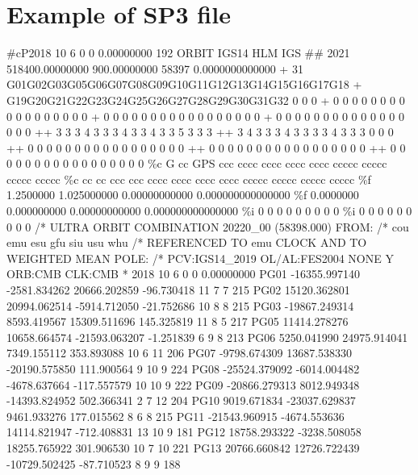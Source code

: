\FloatBarrier
\chapter{Example of SP3 file}
\label{app:sp3}

#cP2018 10  6  0  0  0.00000000     192 ORBIT IGS14 HLM  IGS
## 2021 518400.00000000   900.00000000 58397 0.0000000000000
+   31   G01G02G03G05G06G07G08G09G10G11G12G13G14G15G16G17G18
+        G19G20G21G22G23G24G25G26G27G28G29G30G31G32  0  0  0
+          0  0  0  0  0  0  0  0  0  0  0  0  0  0  0  0  0
+          0  0  0  0  0  0  0  0  0  0  0  0  0  0  0  0  0
+          0  0  0  0  0  0  0  0  0  0  0  0  0  0  0  0  0
++         3  3  3  4  3  3  3  4  3  3  4  3  3  5  3  3  3
++         3  4  3  3  3  4  3  3  3  3  4  3  3  3  0  0  0
++         0  0  0  0  0  0  0  0  0  0  0  0  0  0  0  0  0
++         0  0  0  0  0  0  0  0  0  0  0  0  0  0  0  0  0
++         0  0  0  0  0  0  0  0  0  0  0  0  0  0  0  0  0
\%c G  cc GPS ccc cccc cccc cccc cccc ccccc ccccc ccccc ccccc
\%c cc cc ccc ccc cccc cccc cccc cccc ccccc ccccc ccccc ccccc
\%f  1.2500000  1.025000000  0.00000000000  0.000000000000000
\%f  0.0000000  0.000000000  0.00000000000  0.000000000000000
\%i    0    0    0    0      0      0      0      0         0
\%i    0    0    0    0      0      0      0      0         0
/* ULTRA ORBIT COMBINATION 20220_00 (58398.000) FROM:       
/* cou emu esu gfu siu usu whu                              
/* REFERENCED TO emu CLOCK AND TO WEIGHTED MEAN POLE:       
/* PCV:IGS14_2019 OL/AL:FES2004  NONE     Y  ORB:CMB CLK:CMB
*  2018 10  6  0  0  0.00000000
PG01 -16355.997140  -2581.834262  20666.202859    -96.730418 11  7  7 215       
PG02  15120.362801  20994.062514  -5914.712050    -21.752686 10  8  8 215       
PG03 -19867.249314   8593.419567  15309.511696    145.325819 11  8  5 217       
PG05  11414.278276  10658.664574 -21593.063207     -1.251839  6  9  8 213       
PG06   5250.041990  24975.914041   7349.155112    353.893088 10  6 11 206       
PG07  -9798.674309  13687.538330 -20190.575850    111.900564  9 10  9 224       
PG08 -25524.379092  -6014.004482  -4678.637664   -117.557579 10 10  9 222       
PG09 -20866.279313   8012.949348 -14393.824952    502.366341  2  7 12 204       
PG10   9019.671834 -23037.629837   9461.933276    177.015562  8  6  8 215       
PG11 -21543.960915  -4674.553636  14114.821947   -712.408831 13 10  9 181       
PG12  18758.293322  -3238.508058  18255.765922    301.906530 10  7 10 221       
PG13  20766.660842  12726.722439 -10729.502425    -87.710523  8  9  9 188       
